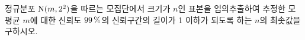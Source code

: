 정규분포 $\mathrm{N}(m{,}\mkern3mu\mathopen{}2^2)$을 따르는 모집단에서 크기가 $n$인 표본을 임의추출하여 추정한 모평균 $m$에 대한 신뢰도 $99\mkern3mu \%$의 신뢰구간의 길이가 1 이하가 되도록 하는 $n$의 최솟값을 구하시오. 
